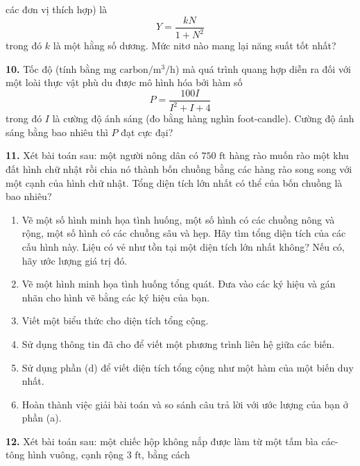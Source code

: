 \documentclass[10pt]{article}
\begin{document}
\begin{minipage}[t]{0.48\textwidth}
\fontsize{9}{12.2}\selectfont

các đơn vị thích hợp) là
\[
Y = \frac{kN}{1 + N^2}
\]
trong đó $k$ là một hằng số dương. Mức nitơ nào mang lại năng suất tốt nhất?

\vspace{5pt}
\hangindent=18pt
\textbf{10.} Tốc độ (tính bằng $\text{mg carbon}/\text{m}^3/\text{h}$) mà quá trình quang hợp diễn ra đối với một loài thực vật phù du được mô hình hóa bởi hàm số
\[
P = \frac{100I}{I^2 + I + 4}
\]
trong đó $I$ là cường độ ánh sáng (đo bằng hàng nghìn foot-candle). Cường độ ánh sáng bằng bao nhiêu thì $P$ đạt cực đại?

\vspace{5pt}
\hangindent=18pt
\textbf{11.} Xét bài toán sau: một người nông dân có $750\text{ ft}$ hàng rào muốn rào một khu đất hình chữ nhật rồi chia nó thành bốn chuồng bằng các hàng rào song song với một cạnh của hình chữ nhật. Tổng diện tích lớn nhất có thể của bốn chuồng là bao nhiêu?
\begin{enumerate}[label=\textbf{(\alph*)}, leftmargin=18pt, labelsep=4pt, itemsep=2pt, parsep=0pt, topsep=2.5pt]
    \item Vẽ một số hình minh họa tình huống, một số hình có các chuồng nông và rộng, một số hình có các chuồng sâu và hẹp. Hãy tìm tổng diện tích của các cấu hình này. Liệu có vẻ như tồn tại một diện tích lớn nhất không? Nếu có, hãy ước lượng giá trị đó.
    \item Vẽ một hình minh họa tình huống tổng quát. Đưa vào các ký hiệu và gán nhãn cho hình vẽ bằng các ký hiệu của bạn.
    \item Viết một biểu thức cho diện tích tổng cộng.
    \item Sử dụng thông tin đã cho để viết một phương trình liên hệ giữa các biến.
    \item Sử dụng phần (d) để viết diện tích tổng cộng như một hàm của một biến duy nhất.
    \item Hoàn thành việc giải bài toán và so sánh câu trả lời với ước lượng của bạn ở phần (a).
\end{enumerate}

\vspace{5pt}
\hangindent=18pt
\textbf{12.} Xét bài toán sau: một chiếc hộp không nắp được làm từ một tấm bìa các-tông hình vuông, cạnh rộng $3\text{ ft}$, bằng cách

\end{minipage}
\end{document}
